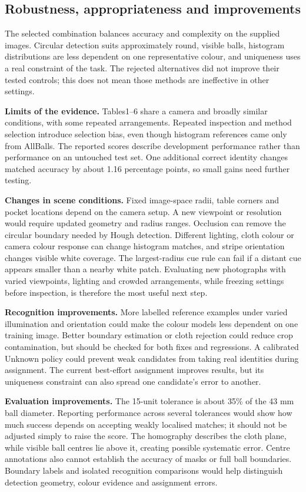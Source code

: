 \documentclass[12pt,a4paper]{article}
\begin{document}
\newpage
\subsection{Robustness, appropriateness and improvements}
The selected combination balances accuracy and complexity on the supplied images.
Circular detection suits approximately round, visible balls, histogram distributions
are less dependent on one representative colour, and uniqueness uses a real constraint
of the task. The rejected alternatives did not improve their tested controls; this
does not mean those methods are ineffective in other settings.

\textbf{Limits of the evidence.} Tables1--6 share a camera and broadly similar
conditions, with some repeated arrangements. Repeated inspection and method selection
introduce selection bias, even though histogram references came only from AllBalls.
The reported scores describe development performance rather than performance on an
untouched test set. One additional correct identity changes matched accuracy by
about 1.16 percentage points, so small gains need further testing.

\textbf{Changes in scene conditions.} Fixed image-space radii, table corners and
pocket locations depend on the camera setup. A new viewpoint or resolution would
require updated geometry and radius ranges. Occlusion can remove the circular
boundary needed by Hough detection. Different lighting, cloth colour or camera colour
response can change histogram matches, and stripe orientation changes visible white
coverage. The largest-radius cue rule can fail if a distant cue appears smaller than
a nearby white patch. Evaluating new photographs with varied viewpoints, lighting
and crowded arrangements, while freezing settings before inspection, is therefore
the most useful next step.

\textbf{Recognition improvements.} More labelled reference examples under varied
illumination and orientation could make the colour models less dependent on one
training image. Better boundary estimation or cloth rejection could reduce crop
contamination, but should be checked for both fixes and regressions. A calibrated
Unknown policy could prevent weak candidates from taking real identities during
assignment. The current best-effort assignment improves results, but its uniqueness
constraint can also spread one candidate's error to another.

\textbf{Evaluation improvements.} The 15-unit tolerance is about 35\% of the 43 mm
ball diameter. Reporting performance across several tolerances would show how much
success depends on accepting weakly localised matches; it should not be adjusted
simply to raise the score. The homography describes the cloth plane, while visible
ball centres lie above it, creating possible systematic error. Centre annotations
also cannot establish the accuracy of masks or full ball boundaries. Boundary labels
and isolated recognition comparisons would help distinguish detection geometry,
colour evidence and assignment errors.
\end{document}
